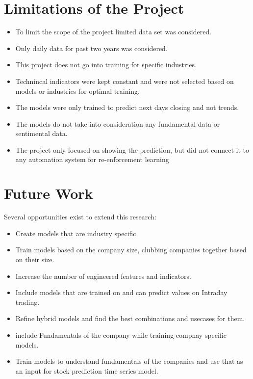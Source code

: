 \section{Limitations of the Project}

\begin{itemize}
  \item To limit the scope of the project limited data set was considered.
  \item Only daily data for past two years was considered.
  \item This project does not go into training for specific industries.
  \item Technincal indicators were kept constant and were not selected based on models or industries for optimal training.
  \item The models were only trained to predict next days closing and not trends.
  \item The models do not take into consideration any fundamental data or sentimental data.
  \item The project only focused on showing the prediction, but did not connect it to any automation system for re-enforcement learning
\end{itemize}

\section{Future Work}

Several opportunities exist to extend this research:

\begin{itemize} 
  \item Create models that are industry specific.
  \item Train models based on the company size, clubbing companies together based on their size.
  \item Increase the number of engineered features and indicators.
  \item Include models that are trained on and can predict values on Intraday trading.
  \item Refine hybrid models and find the best combinations and usecases for them.
  \item include Fundamentals of the company while training compnay specific models.
  \item Train models to understand fundamentals of the companies and use that as an input for stock prediction time series model.
\end{itemize}

